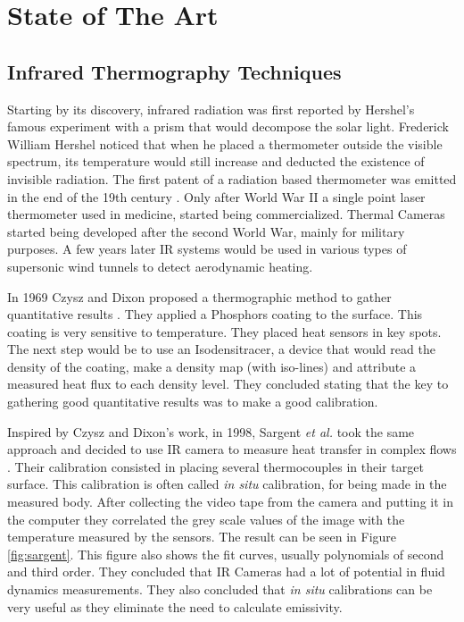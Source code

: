 \section{State of The Art}
\label{sec:int_state}
\subsection{Infrared Thermography Techniques}
\par Starting by its discovery, infrared radiation was first reported by Hershel's famous experiment with a prism that would decompose the solar light. Frederick William Hershel noticed that when he placed a thermometer outside the visible spectrum, its temperature would still increase and deducted the existence of invisible radiation. The first patent of a radiation based thermometer was emitted in the end of the 19th century \cite{DeWitt1988}. Only after World War II a single point laser thermometer used in medicine, started being commercialized. Thermal Cameras started being developed after the second World War, mainly for military purposes. A few years later IR systems would be used in various types of supersonic wind tunnels to detect aerodynamic heating. \\

\par In 1969 Czysz and Dixon proposed a thermographic method to gather quantitative results \cite{Dixon1969}. They applied a Phosphors coating to the surface. This coating is very sensitive to temperature. They placed heat sensors in key spots. The next step would be to use an Isodensitracer, a device that would read the density of the coating, make a density map (with iso-lines) and attribute a measured heat flux to each density level. They concluded stating that the key to gathering good quantitative results was to make a good calibration. \\
\par Inspired by Czysz and Dixon's work, in 1998, Sargent \textit{et al.} took the same approach and decided to use IR camera to measure heat transfer in complex flows \cite{Sargent1998}. Their calibration consisted in placing several thermocouples in their target surface. This calibration is often called \textit{in situ} calibration, for being made in the measured body. After collecting the video tape from the camera and putting it in the computer they correlated the grey scale values of the image with the temperature measured by the sensors. The result can be seen in Figure \ref{fig:sargent}. This figure also shows the fit curves, usually polynomials of second and third order. They concluded that IR Cameras had a lot of potential in fluid dynamics measurements. They also concluded that \textit{in situ } calibrations can be very useful as they eliminate the need to calculate emissivity. \\

